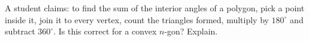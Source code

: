 A student claims: to find the sum of the interior angles of a polygon, pick a point inside it, join it to every vertex, count the triangles formed, multiply by $180^\circ$ and subtract $360^\circ$. Is this correct for a convex $n$-gon? Explain.
